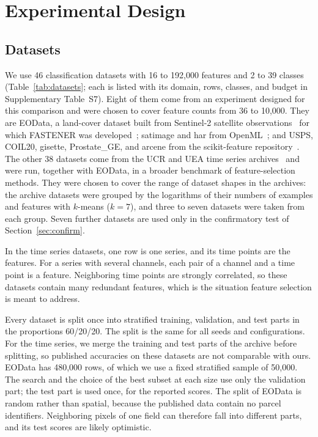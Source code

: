 
\section{Experimental Design}
\label{sec:design}

\subsection{Datasets}
\label{sec:datasets}



We use 46 classification datasets with 16 to 192{,}000 features and 2 to 39 classes (Table~\ref{tab:datasets}; each is listed with its domain, rows, classes, and budget in Supplementary Table~S7). Eight of them come from an experiment designed for this comparison and were chosen to cover feature counts from 36 to 10{,}000. They are EOData, a land-cover dataset built from Sentinel-2 satellite observations~\cite{Sircelj2020EOData} for which FASTENER was developed~\cite{Koprivec2020}; satimage and har from OpenML~\cite{Vanschoren2014OpenML}; and USPS, COIL20, gisette, Prostate\_GE, and arcene from the scikit-feature repository~\cite{Li2017ScikitFeature}. The other 38 datasets come from the UCR and UEA time series archives~\cite{Dau2019UCR,Bagnall2018UEA} and were run, together with EOData, in a broader benchmark of feature-selection methods. They were chosen to cover the range of dataset shapes in the archives: the archive datasets were grouped by the logarithms of their numbers of examples and features with $k$-means ($k = 7$), and three to seven datasets were taken from each group. Seven further datasets are used only in the confirmatory test of Section~\ref{sec:confirm}.

In the time series datasets, one row is one series, and its time points are the features. For a series with several channels, each pair of a channel and a time point is a feature. Neighboring time points are strongly correlated, so these datasets contain many redundant features, which is the situation feature selection is meant to address.

Every dataset is split once into stratified training, validation, and test parts in the proportions 60/20/20. The split is the same for all seeds and configurations. For the time series, we merge the training and test parts of the archive before splitting, so published accuracies on these datasets are not comparable with ours. EOData has 480{,}000 rows, of which we use a fixed stratified sample of 50{,}000. The search and the choice of the best subset at each size use only the validation part; the test part is used once, for the reported scores. The split of EOData is random rather than spatial, because the published data contain no parcel identifiers. Neighboring pixels of one field can therefore fall into different parts, and its test scores are likely optimistic.

